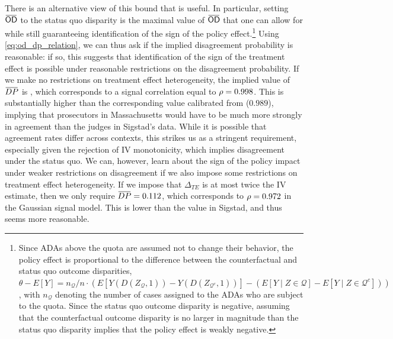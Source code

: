 \documentclass[12pt]{article}%
\theoremstyle{definition}
\newcommand\1{\operatorname{I}\indicatorfence}
\newcommand{\overbar}[1]{\mkern 1.5mu\overline{\mkern-1.5mu#1\mkern-1.5mu}%
  \mkern 1.5mu}%
\newcommand{\OD}{\mathsf{OD}}
\begin{document}
There is an alternative view of this bound that is useful. In particular,
setting $\overbar{\OD}$ to the status quo disparity is the maximal value of
$\overbar{\OD}$ that one can allow for while still guaranteeing identification
of the sign of the policy effect.\footnote{Since ADAs above the quota are
  assumed not to change their behavior, the policy effect is proportional to the difference between the counterfactual and status quo outcome disparities, $\theta-E[Y]=n_{\mathcal{Q}}/n\cdot (E[Y(D(Z_{\mathcal{Q}}, 1))-
  Y(D(Z_{\mathcal{Q}^c}, 1))]-(E[Y\mid Z\in\mathcal{Q}]-E[Y\mid
  Z\in\mathcal{Q}^c]))$, with $n_{\mathcal{Q}}$ denoting the number of cases
  assigned to the ADAs who are subject to the quota. Since the status quo
  outcome disparity is negative, assuming that the counterfactual outcome
  disparity is no larger in magnitude than the status quo disparity implies that the
  policy effect is weakly negative.} Using \cref{eq:od_dp_relation}, we can thus
ask if the implied disagreement probability is reasonable: if so, this suggests
that identification of the sign of the treatment effect is possible under
reasonable restrictions on the disagreement probability. If we make no
restrictions on treatment effect heterogeneity, the implied value of
$\overbar{DP}$ is \sufDP, which corresponds to a signal correlation equal to
$\rho=0.998$. This is substantially higher than the corresponding value
calibrated from \textcite{sigstad_monotonicity_2023} ($0.989$), implying that
prosecutors in Massachusetts would have to be much more strongly in agreement
than the judges in Sigstad's data. While it is possible that agreement rates
differ across contexts, this strikes us as a stringent requirement, especially
given the rejection of IV monotonicity, which implies disagreement under the
status quo. We can, however, learn about the sign of the policy impact under
weaker restrictions on disagreement if we also impose some restrictions on
treatment effect heterogeneity. If we impose that $\Delta_{TE}$ is at most twice
the IV estimate, then we only require $\overbar{DP} = \sufDPIV$, which
corresponds to $\rho = 0.972$ in the Gaussian signal model. This is lower
than the value in Sigstad, and thus seems more reasonable.

\printbibliography%



\newpage
\end{document}
